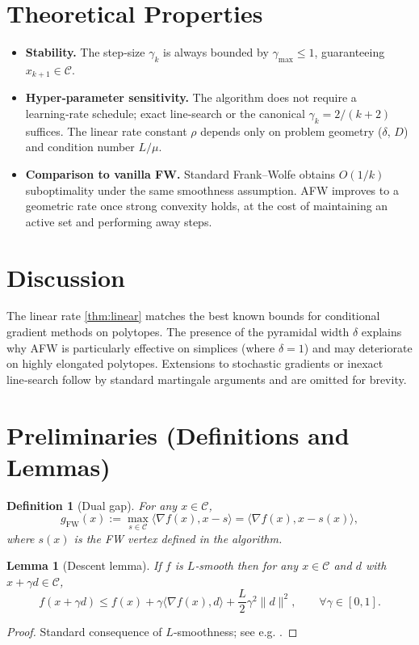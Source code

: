 \documentclass{article}
\newtheorem{lemma}{Lemma}[section]
\newtheorem{definition}{Definition}[section]
\begin{document}
\section*{Theoretical Properties}
\begin{itemize}
\item \textbf{Stability.} The step‑size $\gamma_k$ is always bounded by $\gamma_{\max}\le 1$, guaranteeing $x_{k+1}\in\mathcal C$.
\item \textbf{Hyper‑parameter sensitivity.} The algorithm does not require a learning‑rate schedule; exact line‑search or the canonical $\gamma_k=2/(k+2)$ suffices.  The linear rate constant $\rho$ depends only on problem geometry ($\delta$, $D$) and condition number $L/\mu$.
\item \textbf{Comparison to vanilla FW.} Standard Frank–Wolfe obtains $O(1/k)$ suboptimality under the same smoothness assumption.  AFW improves to a geometric rate once strong convexity holds, at the cost of maintaining an active set and performing away steps.
\end{itemize}

\section*{Discussion}
The linear rate \eqref{thm:linear} matches the best known bounds for conditional gradient methods on polytopes.  The presence of the pyramidal width $\delta$ explains why AFW is particularly effective on simplices (where $\delta=1$) and may deteriorate on highly elongated polytopes.  Extensions to stochastic gradients or inexact line‑search follow by standard martingale arguments and are omitted for brevity.

\newpage
\section*{Preliminaries (Definitions and Lemmas)}
\begin{definition}[Dual gap]
For any $x\in\mathcal C$,
\[
g_{\text{FW}}(x):=\max_{s\in\mathcal C}\langle\nabla f(x),x-s\rangle
               =\langle\nabla f(x),x-s(x)\rangle,
\]
where $s(x)$ is the FW vertex defined in the algorithm.
\end{definition}

\begin{lemma}[Descent lemma]\label{lem:descent}
If $f$ is $L$‑smooth then for any $x\in\mathcal C$ and $d$ with $x+\gamma d\in\mathcal C$,
\[
f(x+\gamma d)\le f(x)+\gamma\langle\nabla f(x),d\rangle+\frac{L}{2}\gamma^2\|d\|^2,\qquad\forall\gamma\in[0,1].
\]
\end{lemma}
\begin{proof}
Standard consequence of $L$‑smoothness; see e.g. \cite{nesterov2004intro}. \qedhere
\end{proof}
\end{document}
